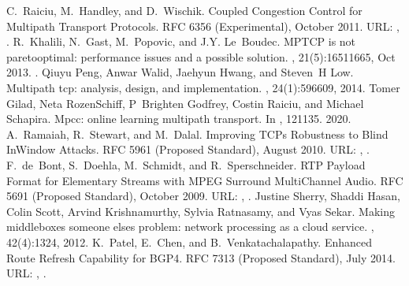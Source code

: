 \documentclass[letterpaper,10pt,english]{sphinxmanual}
\begin{document}
\begin{sphinxthebibliography}{10}
\sphinxAtStartPar
C. Raiciu, M. Handley, and D. Wischik. Coupled Congestion Control for Multipath Transport Protocols. RFC 6356 (Experimental), October 2011. URL: , .
\sphinxAtStartPar
R. Khalili, N. Gast, M. Popovic, and J.\sphinxhyphen{}Y. Le Boudec. MPTCP is not pareto\sphinxhyphen{}optimal: performance issues and a possible solution. , 21(5):1651\textendash{}1665, Oct 2013. .
\sphinxAtStartPar
Qiuyu Peng, Anwar Walid, Jaehyun Hwang, and Steven H Low. Multipath tcp: analysis, design, and implementation. , 24(1):596\textendash{}609, 2014.
\sphinxAtStartPar
Tomer Gilad, Neta Rozen\sphinxhyphen{}Schiff, P Brighten Godfrey, Costin Raiciu, and Michael Schapira. Mpcc: online learning multipath transport. In , 121\textendash{}135. 2020.
\sphinxAtStartPar
A. Ramaiah, R. Stewart, and M. Dalal. Improving TCP\textquotesingle{}s Robustness to Blind In\sphinxhyphen{}Window Attacks. RFC 5961 (Proposed Standard), August 2010. URL: , .
\sphinxAtStartPar
F. de Bont, S. Doehla, M. Schmidt, and R. Sperschneider. RTP Payload Format for Elementary Streams with MPEG Surround Multi\sphinxhyphen{}Channel Audio. RFC 5691 (Proposed Standard), October 2009. URL: , .
\sphinxAtStartPar
Justine Sherry, Shaddi Hasan, Colin Scott, Arvind Krishnamurthy, Sylvia Ratnasamy, and Vyas Sekar. Making middleboxes someone else\textquotesingle{}s problem: network processing as a cloud service. , 42(4):13\textendash{}24, 2012.
\sphinxAtStartPar
K. Patel, E. Chen, and B. Venkatachalapathy. Enhanced Route Refresh Capability for BGP\sphinxhyphen{}4. RFC 7313 (Proposed Standard), July 2014. URL: , .

\end{sphinxthebibliography}
\end{document}
